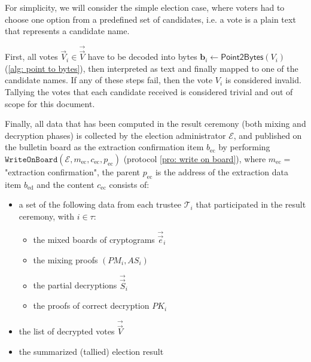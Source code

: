 For simplicity, we will consider the simple election case, where voters had to choose one option from a predefined set of candidates, i.e. a vote is a plain text that represents a candidate name.

First, all votes $\vec{V}_i \in \vec{\vec{V}}$ have to be decoded into bytes $\boldsymbol{b}_i \gets \mathsf{Point2Bytes}(V_i)$ (\cref{alg: point to bytes}), then interpreted as text and finally mapped to one of the candidate names. If any of these steps fail, then the vote $V_i$ is considered invalid. Tallying the votes that each candidate received is considered trivial and out of scope for this document.

Finally, all data that has been computed in the result ceremony (both mixing and decryption phases) is collected by the election administrator $\mathcal{E}$, and published on the bulletin board as the extraction confirmation item $b_\mathrm{ec}$ by performing $\mathtt{WriteOnBoard}(\mathcal{E}, m_\mathrm{ec}, c_\mathrm{ec}, p_\mathrm{ec})$ (protocol \ref{pro: write on board}), where $m_\mathrm{ec} = $ "extraction confirmation", the parent $p_\mathrm{ec}$ is the address of the extraction data item $b_\mathrm{ed}$  and the content $c_\mathrm{ec}$ consists of:
\begin{itemize}
    \item a set of the following data from each trustee $\mathcal{T}_i$ that participated in the result ceremony, with $i \in \tau$:
    \begin{itemize}
        \item the mixed boards of cryptograms $\vec{\vec{e}}_i$
        \item the mixing proofs $(PM_i, AS_i)$
        \item the partial decryptions $\vec{\vec{S}}_i$
        \item the proofs of correct decryption $PK_i$
    \end{itemize}
    \item the list of decrypted votes $\vec{\vec{V}}$
    \item the summarized (tallied) election result
\end{itemize}
